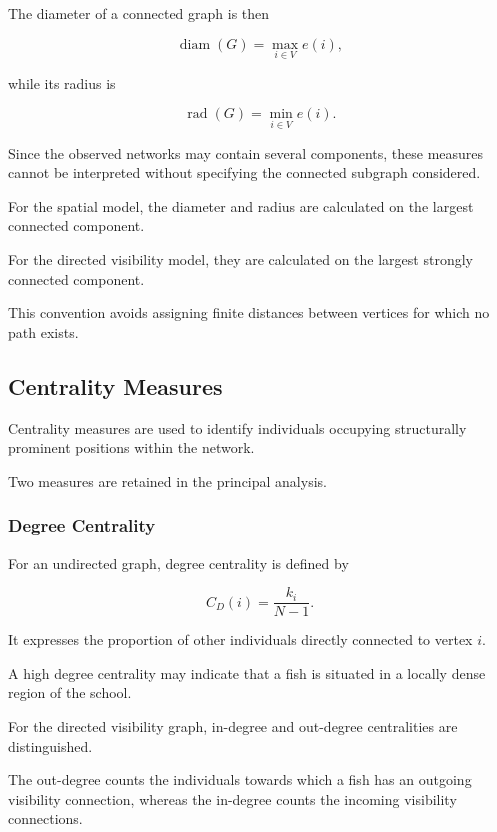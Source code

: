 \documentclass[10pt,a4paper]{article}
\begin{document}
The diameter of a connected graph is then

\begin{equation}
\operatorname{diam}(G)=
\max_{i\in V}e(i),
\end{equation}

while its radius is

\begin{equation}
\operatorname{rad}(G)=
\min_{i\in V}e(i).
\end{equation}

Since the observed networks may contain several
components, these measures cannot be interpreted
without specifying the connected subgraph considered.

For the spatial model, the diameter and radius are
calculated on the largest connected component.

For the directed visibility model, they are calculated
on the largest strongly connected component.

This convention avoids assigning finite distances
between vertices for which no path exists.

\subsection{Centrality Measures}

Centrality measures are used to identify individuals
occupying structurally prominent positions within
the network.

Two measures are retained in the principal analysis.

\subsubsection{Degree Centrality}

For an undirected graph, degree centrality is defined
by

\begin{equation}
C_D(i)=\frac{k_i}{N-1}.
\end{equation}

It expresses the proportion of other individuals
directly connected to vertex $i$.

A high degree centrality may indicate that a fish
is situated in a locally dense region of the school.

For the directed visibility graph, in-degree and
out-degree centralities are distinguished.

The out-degree counts the individuals towards which
a fish has an outgoing visibility connection, whereas
the in-degree counts the incoming visibility
connections.
\end{document}
